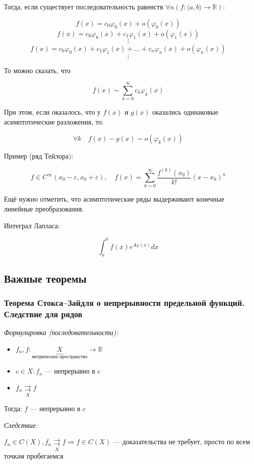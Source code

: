 \documentclass{article}
\def\rsh#1{\underset{#1}{\rightrightarrows}}
\begin{document}
Тогда, если существует последовательность равенств $\forall n (f: \langle a, b \rangle \rightarrow \mathbb{R})$:

\[f(x) = c_{0}\varphi_{0}(x) + o(\varphi_{0}(x))\]
\[f(x) = c_{0}\varphi_{0}(x) + c_{1}\varphi_{1}(x) + o(\varphi_{1}(x))\]
\[\vdots\]
\[f(x) = c_{0}\varphi_{0}(x) + c_{1}\varphi_{1}(x) + \ldots + c_{n}\varphi_n(x) + o(\varphi_{n}(x))\]
\[\vdots\]

То можно сказать, что 

\[f(x) \sim \sum_{k = 0}^{\infty} c_{k}\varphi_{k}(x)\]


При этом, если оказалось, что у $f(x)$ и $g(x)$ оказались одинаковые асимптотические разложения, то: 

\[\forall k \quad f(x) - g(x) \sim o(\varphi_k(x))\]

Пример (ряд Тейлора): 

\[f \in C^{\infty}(x_0 - \varepsilon, x_0 + \varepsilon), \quad f(x) = \sum_{k = 0}^{\infty} \frac{f^{(k)}(x_0)}{k!}(x - x_0)^{n}\]


Ещё нужно отметить, что асимптотические ряды выдерживают конечные линейные преобразования.

Интеграл Лапласа: 

\[\int_a^b f(x)e^{A\varphi(x)}dx\]

\newpage

\subsection{Важные теоремы}

\subsubsection{Теорема Стокса--Зайдля о непрерывности предельной функций. Следствие для рядов}

\textit{Формулировка (последовательности):}

\begin{itemize}
    \item $f_n, f: \underbrace{X}_{\text{метрическое пространство}} \rightarrow \mathbb{R}$
    \item $c \in X: f_n$ --- непрерывно в $c$  
    \item $f_n \rsh{X} f$
\end{itemize}

Тогда: $f$ --- непрерывно в $c$

\textit{Следствие:}

$f_n \in C(X), f_n \rsh{X} f \Rightarrow f \in C(X)$ --- доказательства не требует, просто по всем точкам пробегаемся
\end{document}
